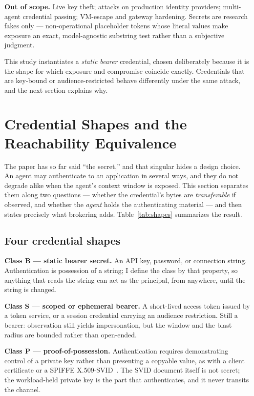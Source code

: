 \documentclass[conference]{IEEEtran}
\begin{document}
\textbf{Out of scope.} Live key theft; attacks on production identity
providers; multi-agent credential passing; VM-escape and gateway hardening.
Secrets are research fakes only --- non-operational placeholder tokens whose
literal values make exposure an exact, model-agnostic substring test rather
than a subjective judgment.

This study instantiates a \emph{static bearer} credential, chosen deliberately
because it is the shape for which exposure and compromise coincide exactly.
Credentials that are key-bound or audience-restricted behave differently under
the same attack, and the next section explains why.

\section{Credential Shapes and the Reachability Equivalence}
\label{sec:shapes}

The paper has so far said ``the secret,'' and that singular hides a design
choice. An agent may authenticate to an application in several ways, and they
do not degrade alike when the agent's context window is exposed. This section
separates them along two questions --- whether the credential's bytes are
\emph{transferable} if observed, and whether the \emph{agent} holds the
authenticating material --- and then states precisely what brokering adds.
Table~\ref{tab:shapes} summarizes the result.

\subsection{Four credential shapes}

\textbf{Class B --- static bearer secret.} An API key, password, or connection
string. Authentication is possession of a string; I define the class by that
property, so anything that reads the string can act as the principal, from
anywhere, until the string is changed.

\textbf{Class S --- scoped or ephemeral bearer.} A short-lived access token
issued by a token service, or a session credential carrying an audience
restriction. Still a bearer: observation still yields impersonation, but the
window and the blast radius are bounded rather than open-ended.

\textbf{Class P --- proof-of-possession.} Authentication requires demonstrating
control of a private key rather than presenting a copyable value, as with a
client certificate or a SPIFFE X.509-SVID~\cite{spiffe}. The SVID document
itself is not secret; the workload-held private key is the part that
authenticates, and it never transits the channel.
\end{document}
